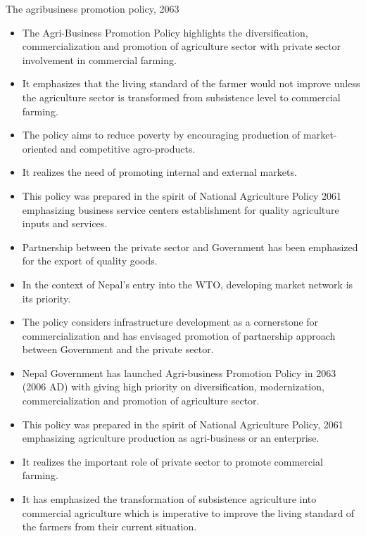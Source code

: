\documentclass[12pt,ignorenonframetext,aspectratio=169]{beamer}
\providecommand{\tightlist}{%
  \setlength{\itemsep}{0pt}\setlength{\parskip}{0pt}}
\begin{document}
\begin{frame}{The agribusiness promotion policy, 2063}
\protect\hypertarget{the-agribusiness-promotion-policy-2063}{}
\footnotesize

\begin{itemize}
\tightlist
\item
  The Agri-Business Promotion Policy highlights the diversification,
  commercialization and promotion of agriculture sector with private
  sector involvement in commercial farming.
\item
  It emphasizes that the living standard of the farmer would not improve
  unless the agriculture sector is transformed from subsistence level to
  commercial farming.
\item
  The policy aims to reduce poverty by encouraging production of
  market-oriented and competitive agro-products.
\item
  It realizes the need of promoting internal and external markets.
\item
  This policy was prepared in the spirit of National Agriculture Policy
  2061 emphasizing business service centers establishment for quality
  agriculture inputs and services.
\item
  Partnership between the private sector and Government has been
  emphasized for the export of quality goods.
\item
  In the context of Nepal's entry into the WTO, developing market
  network is its priority.
\item
  The policy considers infrastructure development as a cornerstone for
  commercialization and has envisaged promotion of partnership approach
  between Government and the private sector.
\end{itemize}
\end{frame}

\begin{frame}{}
\protect\hypertarget{section-1}{}
\begin{itemize}
\tightlist
\item
  Nepal Government has launched Agri-business Promotion Policy in 2063
  (2006 AD) with giving high priority on diversification, modernization,
  commercialization and promotion of agriculture sector.
\item
  This policy was prepared in the spirit of National Agriculture Policy,
  2061 emphasizing agriculture production as agri-business or an
  enterprise.
\item
  It realizes the important role of private sector to promote commercial
  farming.
\item
  It has emphasized the transformation of subsistence agriculture into
  commercial agriculture which is imperative to improve the living
  standard of the farmers from their current situation.
\end{itemize}
\end{frame}
\end{document}

